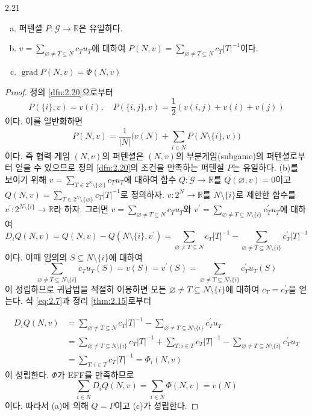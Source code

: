 \documentclass{article}
\numberwithin{equation}{section}
\begin{document}
\begin{thm}{}{2.21}
	\begin{enumerate}[(a)]
		\item 퍼텐셜 $P:\mathcal G\to\mathbb R$은 유일하다.
		\item $v=\sum_{\varnothing\ne T\subseteq N}c_Tu_T$에 대하여 $P(N,v)=\sum_{\varnothing\ne T\subseteq N}c_T\vert T\vert^{-1}$이다.
		\item $\operatorname{grad}P(N,v)=\Phi(N,v)$
	\end{enumerate}
\end{thm}

\begin{proof}
	정의 \ref{dfn:2.20}으로부터
	\[
		P(\{i\},v)=v(i),\quad P(\{i,j\},v)=\frac{1}{2}(v(i,j)+v(i)+v(j))
	\]
	이다. 이를 일반화하면
	\begin{equation}
		\label{eq:2.6}
		P(N,v)=\frac{1}{\vert N\vert}\biggl(v(N)+\sum_{i\in N}P(N\setminus\{i\},v)\biggr)
	\end{equation}
	이다. 즉 협력 게임 $(N,v)$의 퍼텐셜은 $(N,v)$의 부분게임(subgame)의 퍼텐셜로부터 얻을 수 있으므로 정의 \ref{dfn:2.20}의 조건을 만족하는 퍼텐셜 $P$는 유일하다. (b)를 보이기 위해 $v=\sum_{T\in 2^N\setminus\{\varnothing\}}c_Tu_T$에 대하여 함수 $Q:\mathcal G\to\mathbb R$를 $Q(\varnothing,v)=0$이고 $Q(N,v)=\sum_{T\in 2^N\setminus\{\varnothing\}}c_T\vert T\vert^{-1}$로 정의하자. $v:2^N\to\mathbb R$를 $N\setminus\{i\}$로 제한한 함수를 $v^\prime:2^{N\setminus\{i\}}\to\mathbb R$라 하자. 그러면 $v=\sum_{\varnothing\ne T\subseteq N}c_Tu_T$와 $v^\prime=\sum_{\varnothing\ne T\subseteq N\setminus\{i\}}c_T^\prime u_T$에 대하여
	\[
		D_iQ(N,v)=Q(N,v)-Q(N\setminus\{i\},v^\prime)=\sum_{\varnothing\ne T\subseteq N}c_T\vert T\vert^{-1}-\sum_{\varnothing\ne T\subseteq N\setminus\{i\}}c^\prime_T\vert T\vert^{-1}
	\]
	이다. 이때 임의의 $S\subseteq N\setminus\{i\}$에 대하여
	\begin{equation}
		\label{eq:2.7}
		\sum_{\varnothing\ne T\subseteq N\setminus\{i\}}c_Tu_T(S)=v(S)=v^\prime(S)=\sum_{\varnothing\ne T\subseteq N\setminus\{i\}}c_T^\prime u_T(S)
	\end{equation}
	이 성립하므로 귀납법을 적절히 이용하면 모든 $\varnothing\ne T\subseteq N\setminus\{i\}$에 대하여 $c_T=c_T^\prime$을 얻는다. 식 \ref{eq:2.7}과 정리 \ref{thm:2.15}로부터
	
	\[
		\begin{aligned}
			D_iQ(N,v)&=\sum_{\varnothing\ne T\subseteq N}c_T\vert T\vert^{-1}-\sum_{\varnothing\ne T\subseteq N\setminus\{i\}}c_T^\prime u_T\\
			&=\sum_{\varnothing\ne T\subseteq N\setminus\{i\}}c_T\vert T\vert^{-1}+\sum_{T:i\in T}c_T\vert T\vert^{-1}-\sum_{\varnothing\ne T\subseteq N\setminus\{i\}}c_T^\prime u_T\\
			&=\sum_{T:i\in T}c_T\vert T\vert^{-1}=\Phi_i(N,v)
		\end{aligned}
	\]
	이 성립한다. $\Phi$가 EFF를 만족하므로
	\[
		\sum_{i\in N}D_iQ(N,v)=\sum_{i\in N}\Phi(N,v)=v(N)
	\]
	이다. 따라서 (a)에 의해 $Q=P$이고 (c)가 성립한다.
\end{proof}
\end{document}
